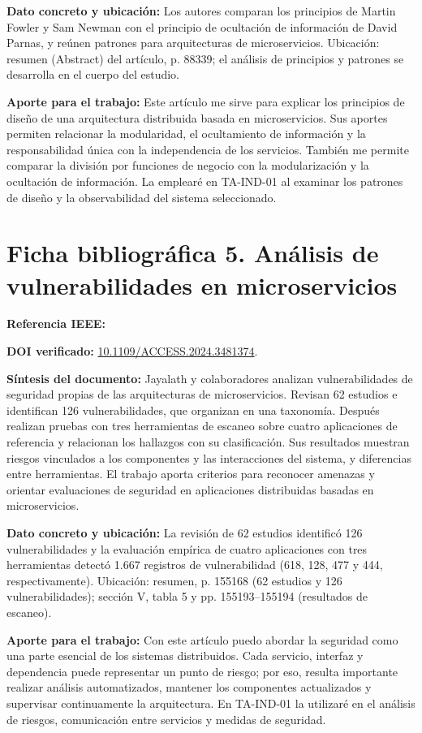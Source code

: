 \documentclass[12pt,a4paper]{article}
\newcommand{\dato}[1]{\textbf{Dato concreto y ubicación:} #1}
\newcommand{\nota}[1]{\textbf{Aporte para el trabajo:} #1}
\newcommand{\resumen}[1]{\textbf{Síntesis del documento:} #1}
\begin{document}
	\dato{Los autores comparan los principios de Martin Fowler y Sam Newman con el principio de ocultación de información de David Parnas, y reúnen patrones para arquitecturas de microservicios. Ubicación: resumen (Abstract) del artículo, p. 88339; el análisis de principios y patrones se desarrolla en el cuerpo del estudio.}
	
	\nota{Este artículo me sirve para explicar los principios de diseño de una arquitectura distribuida basada en microservicios. Sus aportes permiten relacionar la modularidad, el ocultamiento de información y la responsabilidad única con la independencia de los servicios. También me permite comparar la división por funciones de negocio con la modularización y la ocultación de información. La emplearé en TA-IND-01 al examinar los patrones de diseño y la observabilidad del sistema seleccionado.}
	
	\section*{Ficha bibliográfica 5. Análisis de vulnerabilidades en microservicios}
	\textbf{Referencia IEEE:} 
	
	\textbf{DOI verificado:} \href{https://doi.org/10.1109/ACCESS.2024.3481374}{10.1109/ACCESS.2024.3481374}.\par
	
	\resumen{Jayalath y colaboradores analizan vulnerabilidades de seguridad propias de las arquitecturas de microservicios. Revisan 62 estudios e identifican 126 vulnerabilidades, que organizan en una taxonomía. Después realizan pruebas con tres herramientas de escaneo sobre cuatro aplicaciones de referencia y relacionan los hallazgos con su clasificación. Sus resultados muestran riesgos vinculados a los componentes y las interacciones del sistema, y diferencias entre herramientas. El trabajo aporta criterios para reconocer amenazas y orientar evaluaciones de seguridad en aplicaciones distribuidas basadas en microservicios.}
	
	\dato{La revisión de 62 estudios identificó 126 vulnerabilidades y la evaluación empírica de cuatro aplicaciones con tres herramientas detectó 1.667 registros de vulnerabilidad (618, 128, 477 y 444, respectivamente). Ubicación: resumen, p. 155168 (62 estudios y 126 vulnerabilidades); sección V, tabla 5 y pp. 155193--155194 (resultados de escaneo).}
	
	\nota{Con este artículo puedo abordar la seguridad como una parte esencial de los sistemas distribuidos. Cada servicio, interfaz y dependencia puede representar un punto de riesgo; por eso, resulta importante realizar análisis automatizados, mantener los componentes actualizados y supervisar continuamente la arquitectura. En TA-IND-01 la utilizaré en el análisis de riesgos, comunicación entre servicios y medidas de seguridad.}
	
\end{document}
